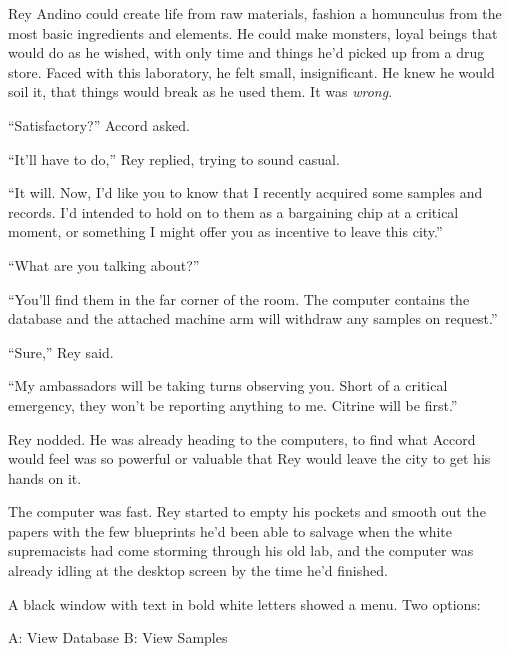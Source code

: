 Rey Andino could create life from raw materials, fashion a homunculus from the most basic ingredients and elements.  He could make monsters, loyal beings that would do as he wished, with only time and things he'd picked up from a drug store.  Faced with this laboratory, he felt small, insignificant.  He knew he would soil it, that things would break as he used them.  It was \emph{wrong}.



``Satisfactory?'' Accord asked.



``It'll have to do,'' Rey replied, trying to sound casual.



``It will.  Now, I'd like you to know that I recently acquired some samples and records.  I'd intended to hold on to them as a bargaining chip at a critical moment, or something I might offer you as incentive to leave this city.''



``What are you talking about?''



``You'll find them in the far corner of the room.  The computer contains the database and the attached machine arm will withdraw any samples on request.''



``Sure,'' Rey said.



``My ambassadors will be taking turns observing you.  Short of a critical emergency, they won't be reporting anything to me.  Citrine will be first.''



Rey nodded.  He was already heading to the computers, to find what Accord would feel was so powerful or valuable that Rey would leave the city to get his hands on it.



The computer was fast.  Rey started to empty his pockets and smooth out the papers with the few blueprints he'd been able to salvage when the white supremacists had come storming through his old lab, and the computer was already idling at the desktop screen by the time he'd finished.



A black window with text in bold white letters showed a menu.  Two options:



A:  View Database
B:  View Samples



